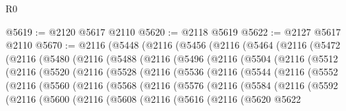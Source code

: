 \begin{lexlean}{R0}
\begin{coremodule}
@5619 := @2120 @5617 @2110
@5620 := @2118 @5619
@5622 := @2127 @5617 @2110
@5670 := @2116
    (@5448
      (@2116
        (@5456
          (@2116
            (@5464
              (@2116
                (@5472
                  (@2116
                    (@5480
                      (@2116
                        (@5488
                          (@2116
                            (@5496
                              (@2116
                                (@5504
                                  (@2116
                                    (@5512
                                      (@2116
                                        (@5520
                                          (@2116
                                            (@5528
                                              (@2116
                                                (@5536
                                                  (@2116
                                                    (@5544
                                                      (@2116
                                                        (@5552
                                                          (@2116
                                                            (@5560
                                                              (@2116
                                                                (@5568
                                                                  (@2116
                                                                    (@5576
                                                                      (@2116
                                                                        (@5584
                                                                          (@2116
                                                                            (@5592
                                                                              (@2116
                                                                                (@5600
                                                                                  (@2116
                                                                                    (@5608
                                                                                      (@2116
                                                                                        (@5616
                                                                                          (@2116
                                                                                            (@5620
                                                                                              @5622

\end{coremodule}
\end{lexlean}
